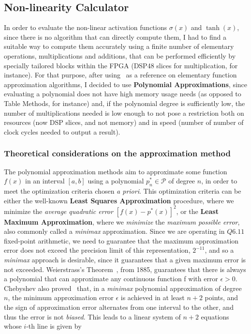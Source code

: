 \subsection{Non-linearity Calculator}\label{sec:nonlincalc}
In order to evaluate the non-linear activation functions $\sigma(x)$ and $\tanh(x)$, since there is no algorithm that can directly compute them, I had to find a suitable way to compute them accurately using a finite number of elementary operations, multiplications and additions, that can be performed efficiently by specially tailored blocks within the FPGA (DSP48 slices for multiplication, for instance). For that purpose, after using~\cite{Muller05} as a reference on elementary function approximation algorithms, I decided to use \textbf{Polynomial Approximations}, since evaluating a polynomial does not have high memory usage needs (as opposed to Table Methods, for instance) and, if the polynomial degree is sufficiently low, the number of multiplications needed is low enough to not pose a restriction both on resources (now DSP slices, and not memory) and in speed (number of number of clock cycles needed to output a result).

\subsubsection{Theoretical considerations on the approximation method}
The polynomial approximation methods aim to approximate some function $f(x)$ in an interval $\left[a, b\right]$ using a polynomial $p^*_n \in \mathcal{P}$ of degree $n$, in order to meet the optimization criteria chosen \textit{a priori}. This optimization criteria can be either the well-known \textbf{Least Squares Approximation} procedure, where we minimize the \emph{average quadratic error} $\left[f(x)-p^*(x)\right]^2$, or the \textbf{Least Maximum Approximation}, where we \emph{minimize} the \emph{maximum possible error}, also commonly called a \textit{minimax} approximation. Since we are operating in $Q6.11$ fixed-point arithmetic, we need to guarantee that the maximum approximation error does not exceed the precision limit of this representation, $2^{-11}$, and so a \textit{minimax} approach is desirable, since it guarantees that a given maximum error is not exceeded. Weierstrass's Theorem~\cite{Weierstrass1885}, from 1885, guarantees that there is always a polynomial that can approximate any continuous function f with error $\epsilon > 0$. Chebyshev also proved~\cite{Muller05} that, in a \textit{minimax} polynomial approximation of degree $n$, the minimum approximation error $\epsilon$ is achieved in at least $n+2$ points, and the sign of approximation error alternates from one interval to the other, and thus the error is not \emph{biased}. This leads to a linear system of $n+2$ equations whose $i$-th line is given by 


